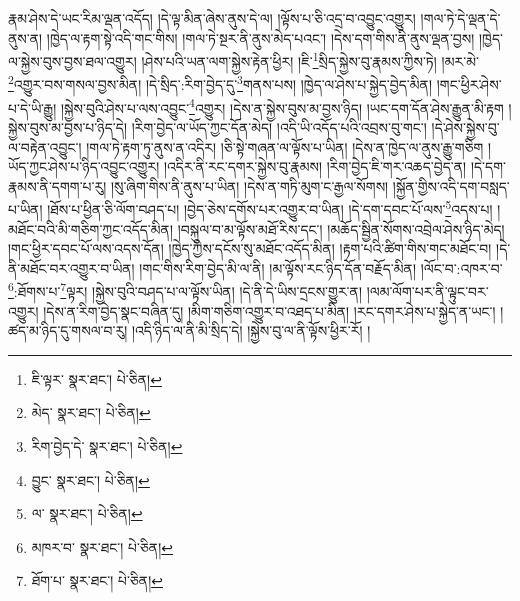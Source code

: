 རྣམ་ཤེས་དེ་ཡང་རིམ་ལྡན་འདོད། །དེ་ལྟ་མིན་ཞེས་ནུས་དེ་ལ། །ལྟོས་པ་ཅི་འདྲ་བ་འབྱུང་འགྱུར། །གལ་ཏེ་དེ་ལྡན་དེ་ནུས་ན། །ཁྱེད་ལ་རྟག་སྟེ་འདི་གང་གིས། །གལ་ཏེ་སྔར་ནི་ནུས་མེད་པའང་། །དེས་དག་གིས་ནི་ནུས་ལྡན་བྱས། །ཁྱེད་ལ་སྐྱེས་བུས་བྱས་ཐལ་འགྱུར། །ཤེས་པའི་ཡན་ལག་སྐྱེས་རྟེན་ཕྱིར། །ཇི་\footnote{ཇི་ལྟར་  སྣར་ཐང་།  པེ་ཅིན། }སྲིད་སྐྱེས་བུ་རྣམས་ཀྱིས་ཏེ། །མར་མེ་\footnote{མེད་  སྣར་ཐང་།  པེ་ཅིན། }འགྱུར་བས་གསལ་བྱས་མིན། །དེ་སྲིད་:རིག་བྱེད་དུ་\footnote{རིག་བྱེད་དེ་  སྣར་ཐང་།  པེ་ཅིན། }གནས་པས། །ཁྱེད་ལ་ཤེས་པ་སྐྱེད་བྱེད་མིན། །གང་ཕྱིར་ཤེས་པ་དེ་ཡི་རྒྱུ། །སྐྱེས་བུའི་ཤེས་པ་ལས་འབྱུང་\footnote{བྱུང་  སྣར་ཐང་།  པེ་ཅིན། }འགྱུར། །དེས་ན་སྐྱེས་བུས་མ་བྱས་ཉིད། །ཡང་དག་དོན་ཤེས་རྒྱུན་མི་རྟག །སྐྱེས་བུས་མ་བྱས་པ་ཉིད་དེ། །རིག་བྱེད་ལ་ཡོད་ཀྱང་དོན་མེད། །འདི་ཡི་འདོད་པའི་འབྲས་བུ་གང་། །དེ་ཤེས་སྐྱེས་བུ་ལ་བརྟེན་འབྱུང་། །གལ་ཏེ་རྟག་ཏུ་ནུས་ན་འདིར། །ཅི་སྟེ་གཞན་ལ་ལྟོས་པ་ཡིན། །དེས་ན་ཁྱེད་ལ་ནུས་རྒྱུ་གཅིག །ཡོད་ཀྱང་ཤེས་པ་ཉིད་འབྱུང་འགྱུར། །འདིར་ནི་རང་དགར་སྐྱེས་བུ་རྣམས། །རིག་བྱེད་ཇི་གར་འཆད་བྱེད་ན། །དེ་དག་རྣམས་ནི་དགག་པ་རུ། །སུ་ཞིག་གིས་ནི་ནུས་པ་ཡིན། །དེས་ན་གཏི་མུག་ང་རྒྱལ་སོགས། །སྐྱོན་གྱིས་འདི་དག་བསླད་པ་ཡིན། །ཐོས་པ་ཕྱིན་ཅི་ལོག་བཤད་པ། །བྱེད་ཅེས་དགོས་པར་འགྱུར་བ་ཡིན། །དེ་དག་དབང་པོ་ལས་\footnote{ལ་  སྣར་ཐང་།  པེ་ཅིན། }འདས་པ། །མཐོང་བའི་མི་གཅིག་ཀྱང་འདོད་མིན། །བསྐུལ་བ་མ་ལྟོས་མཐོ་རིས་དང་། །མཆོད་སྦྱིན་སོགས་འབྲེལ་ཤེས་ཉིད་མེད། །གང་ཕྱིར་དབང་པོ་ལས་འདས་དོན། །ཁྱེད་ཀྱིས་དངོས་སུ་མཐོང་འདོད་མིན། །རྟག་པའི་ཚིག་གིས་གང་མཐོང་བ། །དེ་ནི་མཐོང་བར་འགྱུར་བ་ཡིན། །གང་གིས་རིག་བྱེད་མི་ལ་ནི། །མ་ལྟོས་རང་ཉིད་དོན་བརྗོད་མིན། །ལོང་བ་:འཁར་བ་\footnote{མཁར་བ་  སྣར་ཐང་།  པེ་ཅིན། }:ཐོགས་པ་\footnote{ཐོག་པ་  སྣར་ཐང་།  པེ་ཅིན། }ལྟར། །སྐྱེས་བུའི་བཤད་པ་ལ་ལྟོས་ཡིན། །དེ་ནི་དེ་ཡིས་དྲངས་གྱུར་ན། །ལམ་ལོག་པར་ནི་ལྟུང་བར་འགྱུར། །དེས་ན་རིག་བྱེད་སྣང་བཞིན་དུ། །མིག་གཅིག་འགྱུར་བ་འཐད་པ་མིན། །རང་དགར་ཤེས་པ་སྐྱེད་ན་ཡང་། །ཚད་མ་ཉིད་དུ་གསལ་བ་རུ། །འདི་ཉིད་ལ་ནི་མི་སྲིད་དེ། །སྐྱེས་བུ་ལ་ནི་ལྟོས་ཕྱིར་རོ། །
